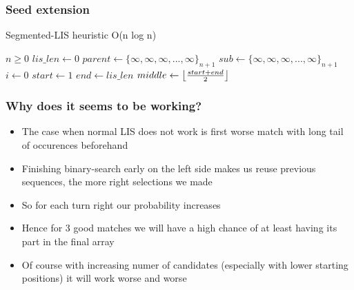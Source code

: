 \documentclass{beamer}
\DeclarePairedDelimiter\floor{\lfloor}{\rfloor}
\begin{document}
\begin{frame}
  \frametitle{Seed extension}
  
  \begin{algorithm}[H]
      \captionsetup{font=scriptsize}
      \caption{Segmented-LIS heuristic O(n log n)}\label{alg:cap}
      \tiny
      \begin{algorithmic}
          \Require $n \geq 0$
          \State $lis\_len \gets 0$ 
          \State $parent \gets \{\infty, \infty, \infty, ..., \infty\}_{n+1}$ 
          \State $sub \gets \{\infty, \infty, \infty, ..., \infty\}_{n+1}$ 
          \State $i \gets 0$
           
              \State $start \gets 1$
              \State $end \gets lis\_len$
               
                  \State $middle \gets \floor*{\frac{start + end}{2}}$
                   
                       
                  \Else
                  \EndIf
              \EndWhile
               
              \EndIf
          \EndWhile
      \end{algorithmic}
  \end{algorithm}
\end{frame}

\begin{frame}
  \frametitle{Why does it seems to be working?}

  \begin{itemize}
    \item The case when normal LIS does not work is first worse match with long tail of occurences beforehand
    \item Finishing binary-search early on the left side makes us reuse previous sequences, the more right selections we made
    \item So for each turn right our probability increases
    \item Hence for 3 good matches we will have a high chance of at least having its part in the final array
    \item Of course with increasing numer of candidates (especially with lower starting positions) it will work worse and worse
  \end{itemize}
\end{frame}
\end{document}
